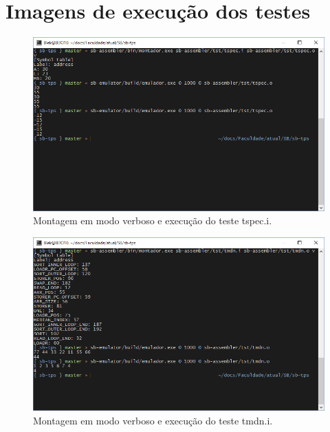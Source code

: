 \documentclass[10pt,a4paper]{article}
\numberwithin{equation}{section}
\begin{document}
\appendix

\section{Imagens de execução dos testes}

\begin{figure}[h]
    \includegraphics[scale=0.7]{imagens/tspec_console.png}
    \centering
    \caption{Montagem em modo verboso e execução do teste tspec.i.}
\end{figure}

\begin{figure}[h]
    \includegraphics[scale=0.7]{imagens/tmdn_console.png}
    \centering
    \caption{Montagem em modo verboso e execução do teste tmdn.i.}
\end{figure}
\end{document}

